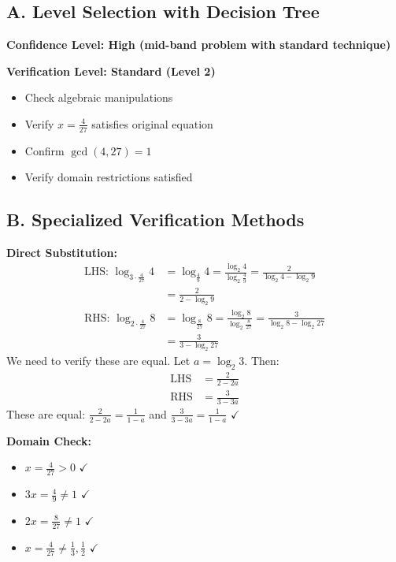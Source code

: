 \documentclass[12pt]{article}
\begin{document}
\begin{verificationbox}
\subsection*{A. Level Selection with Decision Tree}

\textbf{Confidence Level: High (mid-band problem with standard technique)}

\textbf{Verification Level: Standard (Level 2)}
\begin{itemize}
    \item Check algebraic manipulations
    \item Verify $x = \frac{4}{27}$ satisfies original equation
    \item Confirm $\gcd(4, 27) = 1$
    \item Verify domain restrictions satisfied
\end{itemize}

\subsection*{B. Specialized Verification Methods}

\textbf{Direct Substitution:}
\begin{align*}
\text{LHS: } \log_{3 \cdot \frac{4}{27}} 4 &= \log_{\frac{4}{9}} 4 = \frac{\log_2 4}{\log_2 \frac{4}{9}} = \frac{2}{\log_2 4 - \log_2 9} \\
&= \frac{2}{2 - \log_2 9}\\
\text{RHS: } \log_{2 \cdot \frac{4}{27}} 8 &= \log_{\frac{8}{27}} 8 = \frac{\log_2 8}{\log_2 \frac{8}{27}} = \frac{3}{\log_2 8 - \log_2 27}\\
&= \frac{3}{3 - \log_2 27}
\end{align*}
We need to verify these are equal. Let $a = \log_2 3$. Then:
\begin{align*}
\text{LHS} &= \frac{2}{2 - 2a}\\
\text{RHS} &= \frac{3}{3 - 3a}
\end{align*}
These are equal: $\frac{2}{2-2a} = \frac{1}{1-a}$ and $\frac{3}{3-3a} = \frac{1}{1-a}$ $\checkmark$

\textbf{Domain Check:}
\begin{itemize}
    \item $x = \frac{4}{27} > 0$ $\checkmark$
    \item $3x = \frac{4}{9} \neq 1$ $\checkmark$
    \item $2x = \frac{8}{27} \neq 1$ $\checkmark$
    \item $x = \frac{4}{27} \neq \frac{1}{3}, \frac{1}{2}$ $\checkmark$
\end{itemize}


\end{verificationbox}
\end{document}

